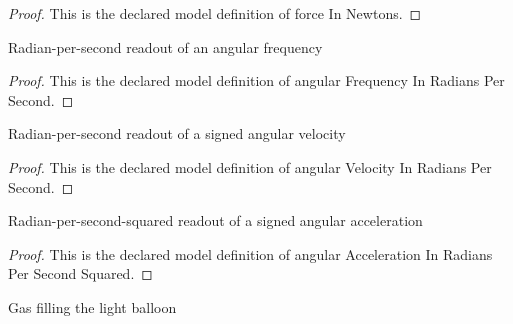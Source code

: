 \begin{proof}
  This is the declared model definition of force In Newtons.
\end{proof}
\begin{definition}
  \label{def:physics:phyx-mini-0234:phyxminiproblems-problemphyxmini0234-angularfrequencyinradianspersecond}
  Radian-per-second readout of an angular frequency
\end{definition}
\begin{proof}
  This is the declared model definition of angular Frequency In Radians Per Second.
\end{proof}
\begin{definition}
  \label{def:physics:phyx-mini-0234:phyxminiproblems-problemphyxmini0234-angularvelocityinradianspersecond}
  Radian-per-second readout of a signed angular velocity
\end{definition}
\begin{proof}
  This is the declared model definition of angular Velocity In Radians Per Second.
\end{proof}
\begin{definition}
  \label{def:physics:phyx-mini-0234:phyxminiproblems-problemphyxmini0234-angularaccelerationinradianspersecondsquared}
  Radian-per-second-squared readout of a signed angular acceleration
\end{definition}
\begin{proof}
  This is the declared model definition of angular Acceleration In Radians Per Second Squared.
\end{proof}
\begin{definition}
  \label{def:physics:phyx-mini-0234:phyxminiproblems-problemphyxmini0234-balloongas}
  Gas filling the light balloon
\end{definition}

